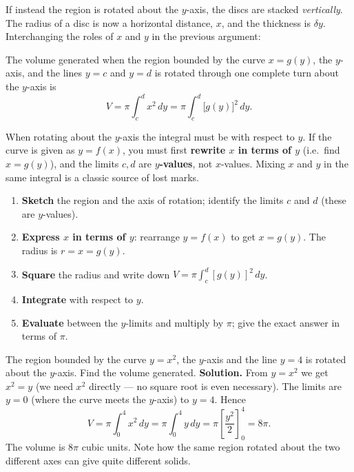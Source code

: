 \documentclass[11pt]{article}
\begin{document}
If instead the region is rotated about the $y$-axis, the discs are stacked \emph{vertically}. The radius of a disc is now a horizontal distance, $x$, and the thickness is $\delta y$. Interchanging the roles of $x$ and $y$ in the previous argument:

\begin{propriete}
The volume generated when the region bounded by the curve $x=g(y)$, the $y$-axis, and the lines $y=c$ and $y=d$ is rotated through one complete turn about the $y$-axis is
\[ V=\pi\int_{c}^{d} x^{2}\,dy=\pi\int_{c}^{d}\bigl[g(y)\bigr]^{2}\,dy. \]
\end{propriete}

\begin{attention}
When rotating about the $y$-axis the integral must be with respect to $y$. If the curve is given as $y=f(x)$, you must first \textbf{rewrite $x$ in terms of $y$} (i.e.\ find $x=g(y)$), and the limits $c,d$ are \textbf{$y$-values}, not $x$-values. Mixing $x$ and $y$ in the same integral is a classic source of lost marks.
\end{attention}

\begin{methode}
\begin{enumerate}
\item \textbf{Sketch} the region and the axis of rotation; identify the limits $c$ and $d$ (these are $y$-values).
\item \textbf{Express $x$ in terms of $y$}: rearrange $y=f(x)$ to get $x=g(y)$. The radius is $r=x=g(y)$.
\item \textbf{Square} the radius and write down $V=\pi\displaystyle\int_{c}^{d}[g(y)]^{2}\,dy$.
\item \textbf{Integrate} with respect to $y$.
\item \textbf{Evaluate} between the $y$-limits and multiply by $\pi$; give the exact answer in terms of $\pi$.
\end{enumerate}
\end{methode}

\begin{exoresolu}
The region bounded by the curve $y=x^{2}$, the $y$-axis and the line $y=4$ is rotated about the $y$-axis. Find the volume generated.
\tcblower
\textbf{Solution.} From $y=x^{2}$ we get $x^{2}=y$ (we need $x^{2}$ directly — no square root is even necessary). The limits are $y=0$ (where the curve meets the $y$-axis) to $y=4$. Hence
\[ V=\pi\int_{0}^{4}x^{2}\,dy=\pi\int_{0}^{4}y\,dy=\pi\left[\frac{y^{2}}{2}\right]_{0}^{4}=8\pi. \]
The volume is $8\pi$ cubic units. Note how the same region rotated about the two different axes can give quite different solids.
\end{exoresolu}
\end{document}
